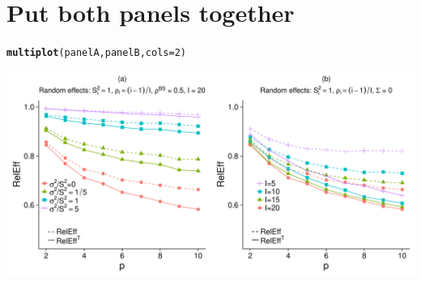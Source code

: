 \documentclass{article}\usepackage[]{graphicx}\usepackage[]{color}
\makeatletter
\def\maxwidth{ %
  \ifdim\Gin@nat@width>\linewidth
    \linewidth
  \else
    \Gin@nat@width
  \fi
}
\newcommand{\hlnum}[1]{\textcolor[rgb]{0.686,0.059,0.569}{#1}}%
\newcommand{\hlstd}[1]{\textcolor[rgb]{0.345,0.345,0.345}{#1}}%
\newcommand{\hlkwc}[1]{\textcolor[rgb]{0.333,0.667,0.333}{#1}}%
\newcommand{\hlkwd}[1]{\textcolor[rgb]{0.737,0.353,0.396}{\textbf{#1}}}%
\newenvironment{kframe}{%
 \def\at@end@of@kframe{}%
 \ifinner\ifhmode%
  \def\at@end@of@kframe{\end{minipage}}%
  \begin{minipage}{\columnwidth}%
 \fi\fi%
 \def\FrameCommand##1{\hskip\@totalleftmargin \hskip-\fboxsep
 \colorbox{shadecolor}{##1}\hskip-\fboxsep
     \hskip-\linewidth \hskip-\@totalleftmargin \hskip\columnwidth}%
 \MakeFramed {\advance\hsize-\width
   \@totalleftmargin\z@ \linewidth\hsize
   \@setminipage}}%
 {\par\unskip\endMakeFramed%
 \at@end@of@kframe}
\newenvironment{knitrout}{}{} %
\makeatother
\begin{document}
\section{Put both panels together}

\begin{knitrout}
\color{fgcolor}\begin{kframe}
\begin{alltt}
\hlkwd{multiplot}\hlstd{(panelA, panelB,} \hlkwc{cols}\hlstd{=}\hlnum{2}\hlstd{)}
\end{alltt}


{\ttfamily\noindent\itshape\color{messagecolor}{\#\# Loading required package: grid}}\end{kframe}

{\centering \includegraphics[width=\maxwidth]{figures/Figure_2_panels_ab-1} 

}



\end{knitrout}
\end{document}

